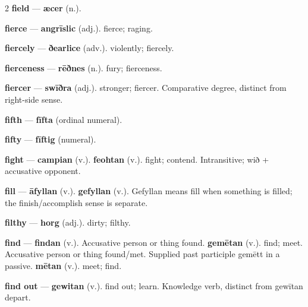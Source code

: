\begin{multicols}{2}
\textbf{field} — \textbf{æcer} (n.).\par
\textbf{fierce} — \textbf{angrīslic} (adj.). fierce; raging.\par
\textbf{fiercely} — \textbf{ðearlice} (adv.). violently; fiercely.\par
\textbf{fierceness} — \textbf{rēðnes} (n.). fury; fierceness.\par
\textbf{fiercer} — \textbf{swīðra} (adj.). stronger; fiercer. Comparative degree, distinct from right-side sense.\par
\textbf{fifth} — \textbf{fīfta} (ordinal numeral).\par
\textbf{fifty} — \textbf{fīftig} (numeral).\par
\textbf{fight} — \textbf{campian} (v.).  \textbf{feohtan} (v.). fight; contend. Intransitive; wið + accusative opponent.\par
\textbf{fill} — \textbf{āfyllan} (v.).  \textbf{gefyllan} (v.). Gefyllan means fill when something is filled; the finish/accomplish sense is separate.\par
\textbf{filthy} — \textbf{horg} (adj.). dirty; filthy.\par
\textbf{find} — \textbf{findan} (v.). Accusative person or thing found. \textbf{gemētan} (v.). find; meet. Accusative person or thing found/met. Supplied past participle gemētt in a passive. \textbf{mētan} (v.). meet; find.\par
\textbf{find out} — \textbf{gewitan} (v.). find out; learn. Knowledge verb, distinct from gewītan depart.\par

\end{multicols}
